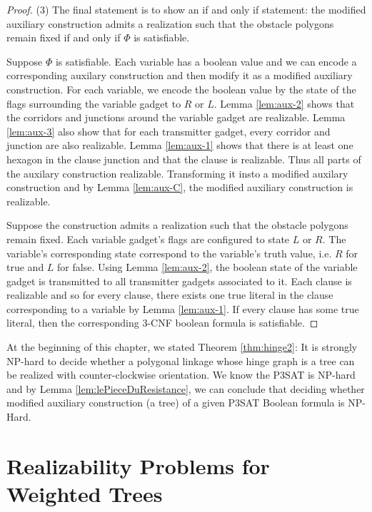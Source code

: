 \documentclass[10pt]{CSUNthesis}
\theoremstyle{plain}%
\theoremstyle{definition}
\theoremstyle{remark}
\begin{document}
\begin{proof}
\noindent (3) The final statement is to show an if and only if statement: the modified auxiliary construction admits a realization such that the obstacle polygons remain fixed if and only if $\Phi$ is satisfiable.

Suppose $\Phi$ is satisfiable.  %
Each variable has a boolean value and we can encode a corresponding auxilary construction and then modify it as a modified auxiliary construction.
For each variable, we encode the boolean value by the state of the flags surrounding the variable gadget to $R$ or $L$.  
Lemma \ref{lem:aux-2} shows that the corridors and junctions around the variable gadget are realizable.
Lemma \ref{lem:aux-3} also show that for each transmitter gadget, every corridor and junction are also realizable. 
Lemma \ref{lem:aux-1} shows that there is at least one hexagon in the clause junction and that the clause is realizable.
Thus all parts of the auxilary construction realizable.  
Transforming it insto a modified auxilary construction and by Lemma \ref{lem:aux-C}, the modified auxiliary construction is realizable.

Suppose the construction admits a realization such that the obstacle polygons remain fixed.
Each variable gadget's flags are configured to state $L$ or $R$. 
The variable's corresponding state correspond to the variable's truth value, i.e. $R$ for true and $L$ for false.
Using Lemma \ref{lem:aux-2}, the boolean state of the variable gadget is transmitted to all transmitter gadgets associated to it.
Each clause is realizable and so for every clause, there exists one true literal in the clause corresponding to a variable by Lemma \ref{lem:aux-1}. 
If every clause has some true literal, then the corresponding 3-CNF boolean formula is satisfiable.
\end{proof}

At the beginning of this chapter, we stated Theorem \ref{thm:hinge2}: It is strongly NP-hard to decide whether a polygonal linkage whose hinge graph is a tree can be realized with counter-clockwise orientation.  
We know the P3SAT is NP-hard \cite{lichtenstein1982planar} and by Lemma \ref{lem:lePieceDuResistance}, we can conclude that deciding whether modified auxiliary construction (a tree) of a given P3SAT Boolean formula is NP-Hard.

\chapter{Realizability Problems for Weighted Trees}\label{chp:disk}
\end{document}
